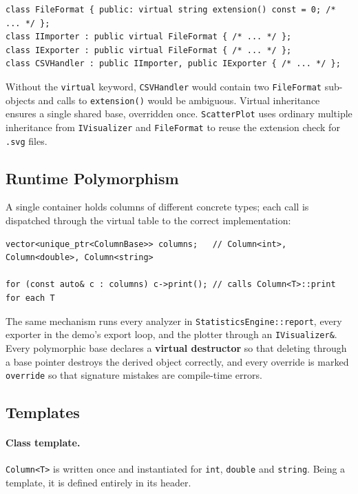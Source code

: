 \documentclass[11pt,a4paper]{article}
\newcommand{\code}[1]{\texttt{#1}}
\begin{document}
\begin{lstlisting}
class FileFormat { public: virtual string extension() const = 0; /* ... */ };
class IImporter : public virtual FileFormat { /* ... */ };
class IExporter : public virtual FileFormat { /* ... */ };
class CSVHandler : public IImporter, public IExporter { /* ... */ };
\end{lstlisting}

Without the \code{virtual} keyword, \code{CSVHandler} would contain two \code{FileFormat}
sub-objects and calls to \code{extension()} would be ambiguous. Virtual inheritance ensures a
single shared base, overridden once. \code{ScatterPlot} uses ordinary multiple inheritance from
\code{IVisualizer} and \code{FileFormat} to reuse the extension check for \code{.svg} files.

\subsection{Runtime Polymorphism}

A single container holds columns of different concrete types; each call is dispatched through the
virtual table to the correct implementation:

\begin{lstlisting}
vector<unique_ptr<ColumnBase>> columns;   // Column<int>, Column<double>, Column<string>

for (const auto& c : columns) c->print(); // calls Column<T>::print for each T
\end{lstlisting}

The same mechanism runs every analyzer in \code{StatisticsEngine::report}, every exporter in the
demo's export loop, and the plotter through an \code{IVisualizer\&}. Every polymorphic base declares a
\textbf{virtual destructor} so that deleting through a base pointer destroys the derived object
correctly, and every override is marked \code{override} so that signature mistakes are compile-time
errors.

\subsection{Templates}

\paragraph{Class template.} \code{Column<T>} is written once and instantiated for \code{int},
\code{double} and \code{string}. Being a template, it is defined entirely in its header.
\end{document}
